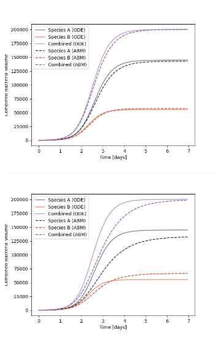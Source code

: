 \documentclass[10pt,A4paper]{article}
\numberwithin{equation}{section}
\begin{document}
\begin{figure}
    \centering
    \begin{subfigure}[c]{0.5\textwidth}
        \includegraphics[width=\textwidth]{Figures/abm-homogenous/abm_ode_comparison.png}
    \end{subfigure}%
    \begin{subfigure}[c]{0.5\textwidth}
        \includegraphics[width=\textwidth]{Figures/abm-homogenous-low-diffusion/abm_ode_comparison.png}
    \end{subfigure}\\

\end{figure}
\end{document}
